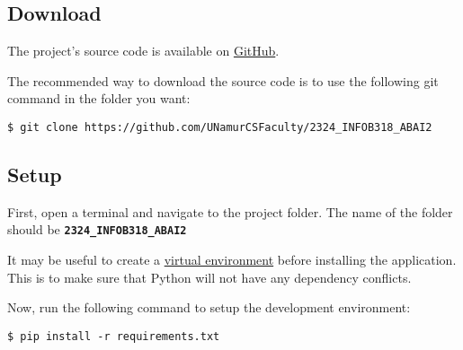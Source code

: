 \subsection{Download}
The project's source code is available on \href{https://github.com/UNamurCSFaculty/2324_INFOB318_ABAI2}{GitHub}.

The recommended way to download the source code is to use the following git command in the folder you want: 
\begin{codebox}
    \large\texttt{\$ git clone https://github.com/UNamurCSFaculty/2324\_INFOB318\_ABAI2}
\end{codebox}

\subsection{Setup}
First, open a terminal and navigate to the project folder. The name of the folder should be \textbf{\texttt{2324\_INFOB318\_ABAI2}}
\begin{tcolorbox}[colback=blue!10!white,colframe=blue!70!black,title=Note]
It may be useful to create a \href{https://docs.python.org/3/tutorial/venv.html}{virtual environment} before installing the application. This is to make sure that Python will not have any dependency conflicts.
\end{tcolorbox}
\vspace{0.5cm}
Now, run the following command to setup the development environment:
\begin{codebox}
    \large\texttt{\$ pip install -r requirements.txt}
\end{codebox}

